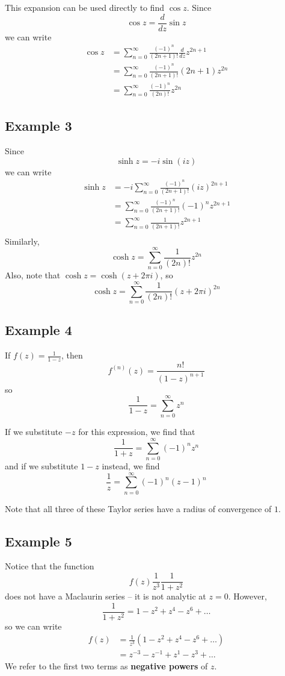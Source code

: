 \documentclass{article}
\renewcommand{\emph}{\textbf}
\begin{document}
This expansion can be used directly to find $\cos z$. Since
\[
	\cos z = \frac{d}{dz} \sin z
\]
we can write
\begin{align*}
	\cos z
	&= \sum_{n=0}^\infty \frac{(-1)^n}{(2n + 1)!} \frac{d}{dz} z^{2n + 1} \\
	&= \sum_{n=0}^\infty \frac{(-1)^n}{(2n + 1)!} (2n + 1) z^{2n} \\
	&= \sum_{n=0}^\infty \frac{(-1)^n}{(2n)!} z^{2n}
\end{align*}

\subsection{Example 3}
Since
\[
	\sinh z = -i\sin(iz)
\]
we can write
\begin{align*}
	\sinh z &= -i \sum_{n=0}^\infty \frac{(-1)^n}{(2n + 1)!} (iz)^{2n + 1} \\
	&= \sum_{n=0}^\infty \frac{(-1)^n}{(2n + 1)!} (-1)^n z^{2n+1} \\
	&= \sum_{n=0}^\infty \frac{1}{(2n + 1)!} z^{2n+1} \\
\end{align*}
Similarly,
\[
	\cosh z
	= \sum_{n=0}^\infty \frac{1}{(2n)!} z^{2n}
\]
Also, note that $\cosh z = \cosh (z + 2\pi i)$, so
\[
	\cosh z = \sum_{n=0}^\infty \frac{1}{(2n)!} (z + 2\pi i)^{2n}
\]

\subsection{Example 4}
If $f(z) = \frac{1}{1 - z}$, then
\[
	f^{(n)}(z) = \frac{n!}{(1 - z)^{n+1}}
\]
so
\[
	\frac{1}{1 - z} = \sum_{n=0}^\infty z^n
\]

If we substitute $-z$ for this expression, we find that
\[
	\frac{1}{1 + z} = \sum_{n=0}^\infty (-1)^n z^n
\]
and if we substitute $1 - z$ instead, we find
\[
	\frac{1}{z} = \sum_{n=0}^\infty (-1)^n (z - 1)^n
\]

Note that all three of these Taylor series have a radius of convergence of $1$.

\subsection{Example 5}
Notice that the function
\[
	f(z) \frac{1}{z^3} \frac{1}{1 + z^2}
\]
does not have a Maclaurin series -- it is not analytic at $z = 0$. However,
\[
	\frac{1}{1 + z^2} = 1 - z^2 + z^4 - z^6 + \dots
\]
so we can write
\begin{align*}
	f(z) 
	&= \frac{1}{z^3} (1 - z^2 + z^4 - z^6 + \dots) \\
	&= z^{-3} - z^{-1} + z^1 - z^3 + \dots
\end{align*}
We refer to the first two terms as \emph{negative powers} of $z$.
\end{document}
